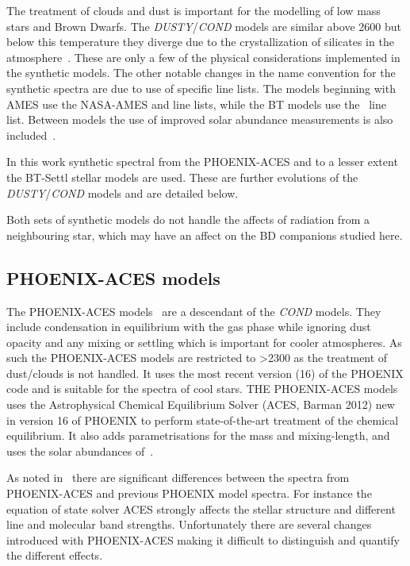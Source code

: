 The treatment of clouds and dust is important for the modelling of low mass stars and Brown Dwarfs.
The \emph{DUSTY}/\emph{COND} models are similar above 2600\K{} but below this temperature they diverge due to the crystallization of silicates in the atmosphere~\citep{allard_limiting_2001}.
These are only a few of the physical considerations implemented in the synthetic models.
The other notable changes in the name convention for the synthetic spectra are due to use of specific line lists.
The models beginning with {AMES} use the {NASA-AMES}  and  line lists, while the {BT} models use the~\citet{barber_highaccuracy_2006}  line list.
Between models the use of improved solar abundance measurements is also included~\citep[][]{asplund_chemical_2009}.

In this work synthetic spectral from the {PHOENIX-ACES} and to a lesser extent the {BT-Settl} stellar models are used.
These are further evolutions of the \emph{DUSTY}/\emph{COND} models and are detailed below.

Both sets of synthetic models do not handle the affects of radiation from a neighbouring star, which may have an affect on the BD companions studied here.

\subsection{{PHOENIX-ACES} models}
\label{subsec:phoenix_aces}

The {PHOENIX-ACES} models~\citep{husser_new_2013} are a descendant of the \emph{COND} models.
They include condensation in equilibrium with the gas phase while ignoring dust opacity and any mixing or settling which is important for cooler atmospheres.
As such the {PHOENIX-ACES} models are restricted to \Teff{}>2300\K{} as the treatment of dust/clouds is not handled.
It uses the most recent version (16) of the {PHOENIX} code and is suitable for the spectra of cool stars.
THE {PHOENIX-ACES} models uses the Astrophysical Chemical Equilibrium Solver (ACES, Barman 2012) new in version 16 of {PHOENIX} to perform state-of-the-art treatment of the chemical equilibrium.
It also adds parametrisations for the mass and mixing-length, and uses the solar abundances of~\citet{asplund_chemical_2009}.

As noted in~\citep{husser_new_2013} there are significant differences between the spectra from {PHOENIX-ACES} and previous {PHOENIX} model spectra.
For instance the equation of state solver ACES strongly affects the stellar structure and different line and molecular band strengths.
Unfortunately there are several changes introduced with {PHOENIX-ACES} making it difficult to distinguish and quantify the different effects.

